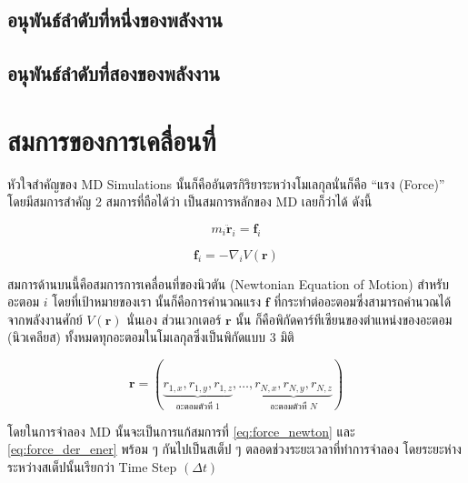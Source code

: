 \subsection{อนุพันธ์ลำดับที่หนึ่งของพลังงาน}

\subsection{อนุพันธ์ลำดับที่สองของพลังงาน}


\section{สมการของการเคลื่อนที่}

หัวใจสำคัญของ MD Simulations นั้นก็คืออันตรกิริยาระหว่างโมเลกุลนั่นก็คือ \enquote{แรง (Force)} โดยมีสมการสำคัญ 2 สมการที่ถือได้ว่า%
เป็นสมการหลักของ MD เลยก็ว่าได้ ดังนี้

\begin{equation}
    \label{eq:force_newton}
    m_{i}\bm{\ddot{r}}_{i} = \bm{f}_{i}
\end{equation}

\begin{equation}
    \label{eq:force_der_ener}
    \bm{f}_{i} = -\nabla_{i}V(\bm{r})
\end{equation}

\noindent สมการด้านบนนี้คือสมการการเคลื่อนที่ของนิวตัน (Newtonian Equation of Motion) สำหรับอะตอม $i$ โดยที่เป้าหมายของเรา%
นั้นก็คือการคำนวณแรง $\bm{f}$ ที่กระทำต่ออะตอมซึ่งสามารถคำนวณได้จากพลังงานศักย์ $V(\bm{r})$ นั่นเอง ส่วนเวกเตอร์ $\bm{r}$ นั้น%
ก็คือพิกัดคาร์ทีเซียนของตำแหน่งของอะตอม (นิวเคลียส) ทั้งหมดทุกอะตอมในโมเลกุลซึ่งเป็นพิกัดแบบ 3 มิติ

\begin{equation}
    \bm{r} = (\underbrace{r_{1,x}, r_{1,y}, r_{1,z}}_{\text{อะตอมตัวที่ 1}}, \dots,
    \underbrace{r_{N,x}, r_{N,y}, r_{N,z}}_{\text{อะตอมตัวที่ $N$}})
\end{equation}

โดยในการจำลอง MD นั้นจะเป็นการแก้สมการที่ \eqref{eq:force_newton} และ \eqref{eq:force_der_ener} พร้อม ๆ กันไปเป็นสเต็ป ๆ
ตลอดช่วงระยะเวลาที่ทำการจำลอง โดยระยะห่างระหว่างสเต็ปนั้นเรียกว่า Time Step $(\Delta t)$

